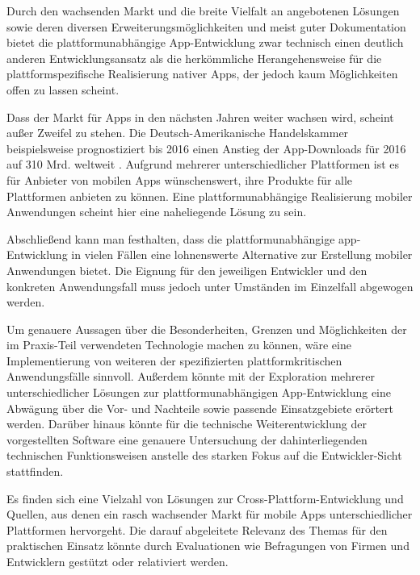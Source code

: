 
Durch den wachsenden Markt und die breite Vielfalt an angebotenen Lösungen sowie deren diversen Erweiterungsmöglichkeiten und meist guter Dokumentation bietet die plattformunabhängige App-Entwicklung zwar technisch einen deutlich anderen Entwicklungsansatz als die herkömmliche Herangehensweise für die plattformspezifische Realisierung nativer Apps, der jedoch kaum Möglichkeiten offen zu lassen scheint.

Dass der Markt für Apps in den nächsten Jahren weiter wachsen wird, scheint außer Zweifel zu stehen. Die Deutsch-Amerikanische Handelskammer beispielsweise prognostiziert bis 2016 einen Anstieg der App-Downloads für 2016 auf 310 Mrd. weltweit \cite{Mobile_Apps_Download-Zahlen}.
Aufgrund mehrerer unterschiedlicher Plattformen ist es für Anbieter von mobilen Apps wünschenswert, ihre Produkte für alle Plattformen anbieten zu können. Eine plattformunabhängige Realisierung mobiler Anwendungen scheint hier eine naheliegende Lösung zu sein. 

Abschließend kann man festhalten, dass die plattformunabhängige \mbox{\gls{app}-}Entwicklung in vielen Fällen eine lohnenswerte Alternative zur Erstellung mobiler Anwendungen bietet.
Die Eignung für den jeweiligen Entwickler und den konkreten Anwendungsfall muss jedoch unter Umständen im Einzelfall abgewogen werden.



Um genauere Aussagen über die Besonderheiten, Grenzen und Möglichkeiten  der im Praxis-Teil verwendeten Technologie machen zu können, wäre eine Implementierung von weiteren der spezifizierten plattformkritischen Anwendungsfälle sinnvoll.
Außerdem könnte mit der Exploration mehrerer unterschiedlicher Lösungen zur plattformunabhängigen App-Entwicklung eine Abwägung über die Vor- und Nachteile sowie passende Einsatzgebiete erörtert werden.
Darüber hinaus könnte für die technische Weiterentwicklung der vorgestellten Software eine genauere Untersuchung der dahinterliegenden technischen Funktionsweisen anstelle des starken Fokus auf die Entwickler-Sicht stattfinden.

Es finden sich eine Vielzahl von Lösungen zur Cross-Plattform-Entwicklung und Quellen, aus denen ein rasch wachsender Markt für mobile Apps unterschiedlicher Plattformen hervorgeht. Die darauf abgeleitete Relevanz des Themas für den praktischen Einsatz könnte durch Evaluationen wie Befragungen von Firmen und Entwicklern gestützt oder relativiert werden.

